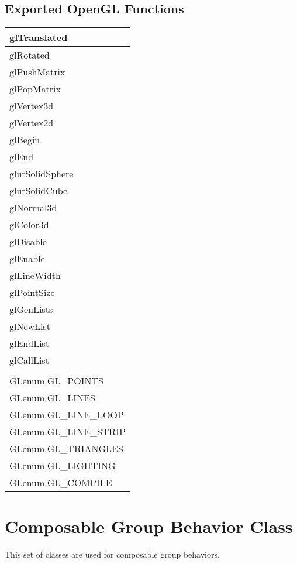 \documentclass[onecolumn,10pt]{article}
\begin{document}
\subsection{Exported OpenGL Functions}

\begin{tabular}{l}
glTranslated \\\hline
glRotated \\\hline
glPushMatrix \\\hline
glPopMatrix \\\hline
glVertex3d \\\hline
glVertex2d \\\hline
glBegin \\\hline
glEnd \\\hline
glutSolidSphere \\\hline
glutSolidCube \\\hline
glNormal3d \\\hline
glColor3d \\\hline
glDisable \\\hline
glEnable \\\hline
glLineWidth \\\hline
glPointSize \\\hline
glGenLists \\\hline
glNewList \\\hline
glEndList \\\hline
glCallList \\
\\
GLenum.GL\_POINTS \\\hline
GLenum.GL\_LINES \\\hline
GLenum.GL\_LINE\_LOOP \\\hline
GLenum.GL\_LINE\_STRIP \\\hline
GLenum.GL\_TRIANGLES \\\hline
GLenum.GL\_LIGHTING \\\hline
GLenum.GL\_COMPILE \\
\end{tabular}



\section{Composable Group Behavior Class}
This set of classes are used for composable group behaviors.
\end{document}
